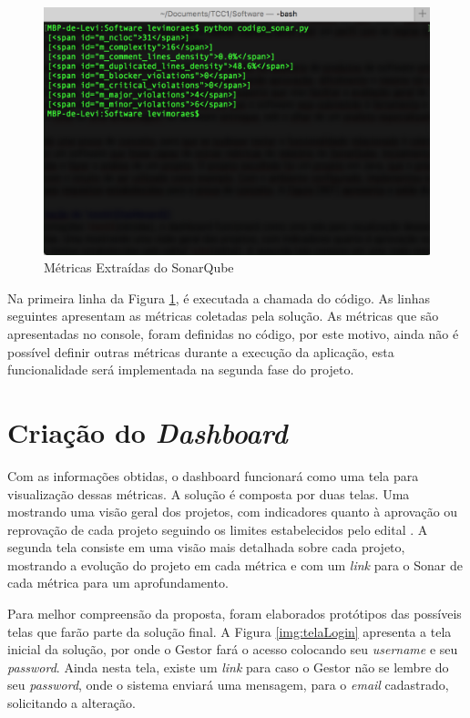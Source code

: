 \graphicspath{{figuras/}}
\begin{figure}[H]
\centering
\includegraphics[scale=0.60]{terminal.png}
\caption{Métricas Extraídas do SonarQube}
\label{img:terminal}
\end{figure}

Na primeira linha da Figura \ref{img:terminal}, é executada a chamada do código. As linhas seguintes apresentam as métricas coletadas pela solução. As métricas que são apresentadas no console, foram definidas no código, por este motivo, ainda não é possível definir outras métricas durante a execução da aplicação, esta funcionalidade será implementada na segunda fase do projeto. 

\section{Criação do \textit{Dashboard}}
Com as informações obtidas, o dashboard funcionará como uma tela para visualização dessas métricas. A solução é composta por duas telas. Uma mostrando uma visão geral dos projetos, com indicadores quanto à aprovação ou reprovação de cada projeto seguindo os limites estabelecidos pelo edital \cite{edital}. A segunda tela consiste em uma visão mais detalhada sobre cada projeto, mostrando a evolução do projeto em cada métrica e com um \textit{link} para o Sonar de cada métrica para um aprofundamento.

Para melhor compreensão da proposta, foram elaborados protótipos das possíveis telas que farão parte da solução final. A Figura \ref{img:telaLogin} apresenta a tela inicial da solução, por onde o Gestor fará o acesso colocando seu \textit{username} e seu \textit{password}. Ainda nesta tela, existe um \textit{link} para caso o Gestor não se lembre do seu \textit{password}, onde o sistema enviará uma mensagem, para o \textit{email} cadastrado, solicitando a alteração.

